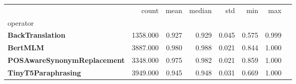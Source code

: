 \begin{tabular}{lrrrrrrr}
\toprule
 & count & mean & median & std & min & max \\
operator &  &  &  &  &  &  \\
\midrule
\textbf{BackTranslation} & 1358.000 & 0.927 & 0.929 & 0.045 & 0.575 & 0.999 \\
\textbf{BertMLM} & 3887.000 & 0.980 & 0.988 & 0.021 & 0.844 & 1.000 \\
\textbf{POSAwareSynonymReplacement} & 3348.000 & 0.975 & 0.982 & 0.021 & 0.859 & 1.000 \\
\textbf{TinyT5Paraphrasing} & 3949.000 & 0.945 & 0.948 & 0.031 & 0.669 & 1.000 \\
\bottomrule
\end{tabular}
